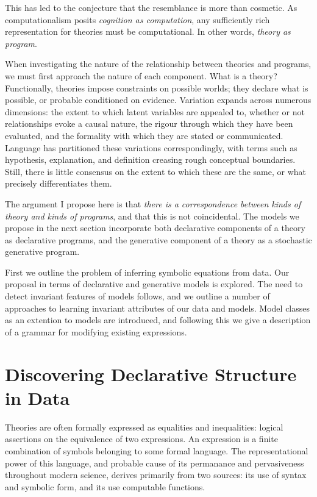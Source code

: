 This has led to the conjecture that the resemblance is more than cosmetic.  As computationalism posits {\em cognition as computation}, any sufficiently rich representation for theories must be computational.
In other words, {\em theory as program}.

When investigating the nature of the relationship between theories and programs, we must first approach the nature of each component.
What is a theory?
Functionally, theories impose constraints on possible worlds; they declare what is possible, or probable conditioned on evidence.
Variation expands across numerous dimensions: the extent to which latent variables are appealed to, whether or not relationships evoke a causal nature, the rigour through which they have been evaluated, and the formality with which they are stated or communicated.
Language has partitioned these variations correspondingly, with
terms such as hypothesis, explanation, and definition creasing rough conceptual boundaries.
Still, there is little consensus on the extent to which these are the same, or what precisely differentiates them.

The argument I propose here is that {\em there is a correspondence between kinds of theory and kinds of programs}, and that this is not coincidental.
The models we propose in the next section incorporate both declarative components of a theory as declarative programs, and the generative component of a theory as a stochastic generative program.

First we outline the problem of inferring symbolic equations from data.  Our proposal in terms of declarative and generative models is explored.  The need to detect invariant features of models follows, and we outline a number of approaches to learning invariant attributes of our data and models.
Model classes as an extention to models are introduced, and following this we give a description of a grammar for modifying existing expressions.

\chapter{Discovering Declarative Structure in Data}

Theories are often formally expressed as equalities and inequalities: logical assertions on the equivalence of two expressions.
An expression is a finite combination of symbols belonging to some formal language.
The representational power of this language, and probable cause of its permanance and pervasiveness throughout modern science,  derives primarily from two sources: its use of syntax and symbolic form, and its use computable functions.

